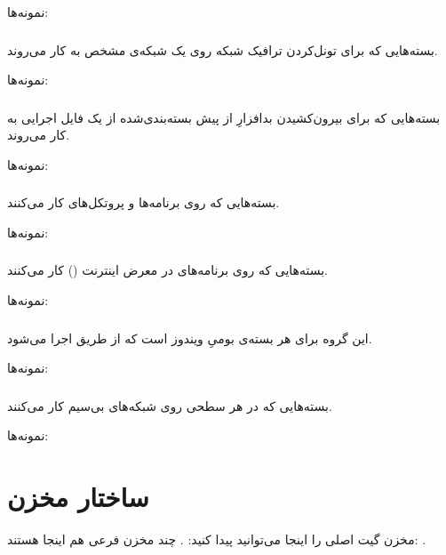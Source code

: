 \documentclass[a4paper, oneside, 11pt]{book}
\begin{document}
نمونه‌ها: 

\subsubsection{}
بسته‌هایی که برای تونل‌کردن ترافیک شبکه روی یک شبکه‌ی مشخص به کار می‌روند.

نمونه‌ها: 

\subsubsection{}
بسته‌هایی که برای بیرون‌کشیدن بدافزارِ از پیش بسته‌بندی‌شده از یک فایل اجرایی
به کار می‌روند.

نمونه‌ها: 

\subsubsection{}
بسته‌هایی که روی برنامه‌ها و پروتکل‌های  کار می‌کنند.

نمونه‌ها: 

\subsubsection{}
بسته‌هایی که روی برنامه‌های در معرض اینترنت () کار می‌کنند.

نمونه‌ها: 

\subsubsection{}
این گروه برای هر بسته‌ی بومیِ ویندوز است که از طریق  اجرا می‌شود.

نمونه‌ها: 

\subsubsection{}
بسته‌هایی که در هر سطحی روی شبکه‌های بی‌سیم کار می‌کنند.

نمونه‌ها: 

\section{ساختار مخزن}
مخزن گیت اصلی  را اینجا می‌توانید پیدا کنید:
\href{https://github.com/BlackArch/blackarch}{}.
چند مخزن فرعی هم اینجا هستند:
\href{https://github.com/BlackArch}{}.
\end{document}
